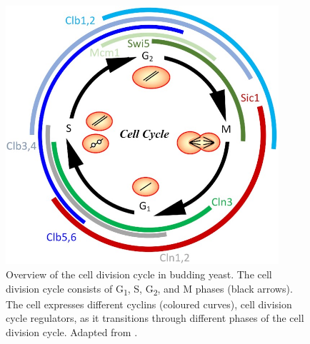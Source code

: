 \begin{figure}
  \centering
  \includegraphics[width=0.9\textwidth]{adlerYeastCellCycle2022_1}
  \caption[
    Overview of the cell division cycle
  ]{
    Overview of the cell division cycle in budding yeast.
    The cell division cycle consists of G\textsubscript{1}, S, G\textsubscript{2}, and M phases (black arrows).
    The cell expresses different cyclins (coloured curves), cell division cycle regulators, as it transitions through different phases of the cell division cycle.
    Adapted from \textcite{adlerYeastCellCycle2022}.}
  \label{fig:intro-cdc-overview}
\end{figure}

